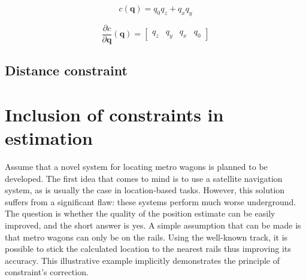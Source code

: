 \begin{equation}
	c \left( \bm{q} \right) = q_{0}q_{z}+q_{x}q_{y}
	\label{yaw_constraint_fun}
\end{equation}

\begin{equation}
	\frac{\partial c}{\partial \bm{q}}  \left( \bm{q} \right) =
	\begin{bmatrix}
	 q_{z} &  q_{y} &  q_{x} &  q_{0}
	\end{bmatrix}
	\label{yaw_constraint_fun_der}
\end{equation}

\subsection{Distance constraint}


\section{Inclusion of constraints in estimation}

Assume that a novel system for locating metro wagons is planned to be developed. The first idea that comes to mind is to use a satellite navigation system, as is usually the case in location-based tasks. However, this solution suffers from a significant flaw: these systems perform much worse underground. The question is whether the quality of the position estimate can be easily improved, and the short answer is yes. A simple assumption that can be made is that metro wagons can only be on the rails. Using the well-known track, it is possible to stick the calculated location to the nearest rails thus improving its accuracy.
This illustrative example implicitly demonstrates the principle of constraint's correction.\\

